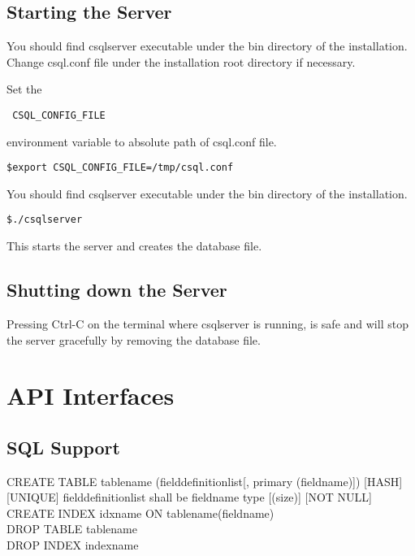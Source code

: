 \documentclass[12pt]{article}
\begin{document}
\subsection{Starting the Server}
\label{startserver}
You should find csqlserver executable under the bin directory of the installation.
Change csql.conf file under the installation root directory if necessary.

Set the \begin{verbatim} CSQL_CONFIG_FILE \end{verbatim} environment variable to absolute path of csql.conf file.

\begin{verbatim}
$export CSQL_CONFIG_FILE=/tmp/csql.conf
\end{verbatim}

You should find csqlserver executable under the bin directory of the installation.
\begin{verbatim}
$./csqlserver
\end{verbatim}

This starts the server and creates the database file.

\subsection{Shutting down the Server}
\label{shutserver}
Pressing Ctrl-C on the terminal where csqlserver is running, is safe and will stop the server gracefully by removing the database file.


\section{API Interfaces}

\subsection{SQL Support}
\label{SQL Syntax Support:}

CREATE TABLE {tablename} ({fielddefinitionlist}[, primary ({fieldname})]) [HASH] [UNIQUE]
     fielddefinitionlist shall be fieldname type [(size)] [NOT NULL] \\

CREATE INDEX {idxname} ON {tablename}({fieldname}) \\

DROP TABLE {tablename} \\

DROP INDEX {indexname} \\
\end{document}
